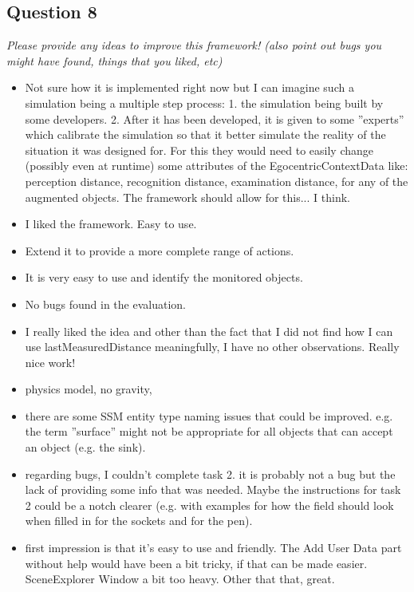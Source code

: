 \subsection{Question 8}
\emph{Please provide any ideas to improve this framework! (also point out bugs you might have found, things that you liked, etc)}

\begin{itemize}
	\item Not sure how it is implemented right now but I can imagine such a simulation being a multiple step process: 1. the simulation being built by some developers. 2. After it has been developed, it is given to some ''experts'' which calibrate the simulation so that it better simulate the reality of the situation it was designed for. For this they would need to easily change (possibly even at runtime) some attributes of the EgocentricContextData like: perception distance, recognition distance, examination distance, for any of the augmented objects. The framework should allow for this... I think.
	\item I liked the framework. Easy to use.
	\item Extend it to provide a more complete range of actions.
	\item It is very easy to use and identify the monitored objects.
	\item No bugs found in the evaluation.
	\item I really liked the idea and other than the fact that I did not find how I can use lastMeasuredDistance meaningfully, I have no other observations. Really nice work!
	\item physics model, no gravity,
	\item there are some SSM entity type naming issues that could be improved. e.g. the term ''surface'' might not be appropriate for all objects that can accept an object (e.g. the sink).
	\item regarding bugs, I couldn't complete task 2. it is probably not a bug but the lack of providing some info that was needed. Maybe the instructions for task 2 could be a notch clearer (e.g. with examples for how the field should look when filled in for the sockets and for the pen).
	\item first impression is that it's easy to use and friendly. The Add User Data part without help would have been a bit tricky, if that can be made easier. SceneExplorer Window a bit too heavy. Other that that, great.

\end{itemize}
